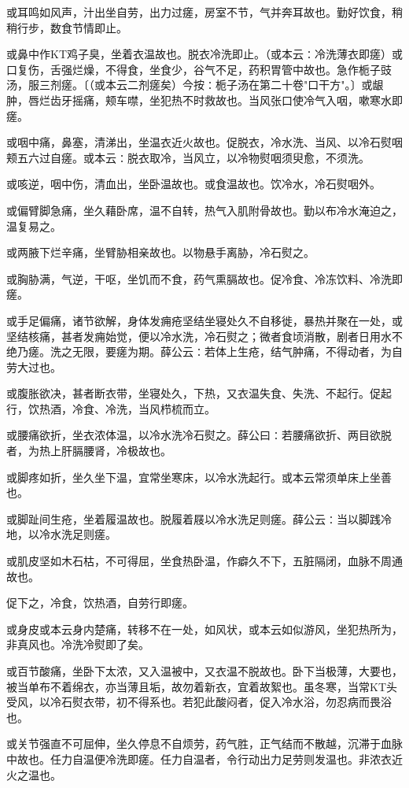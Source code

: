 \documentclass[a4paper,12pt,UTF8,twoside]{ctexbook}
\begin{document}
或耳鸣如风声，汁出坐自劳，出力过瘥，房室不节，气并奔耳故也。勤好饮食，稍稍行步，数食节情即止。

或鼻中作KT鸡子臭，坐着衣温故也。脱衣冷洗即止。（或本云∶冷洗薄衣即瘥）或口复伤，舌强烂燥，不得食，坐食少，谷气不足，药积胃管中故也。急作栀子豉汤，服三剂瘥。〔（或本云二剂瘥矣）今按∶栀子汤在第二十卷"口干方"。〕或龈肿，唇烂齿牙摇痛，颊车噤，坐犯热不时救故也。当风张口使冷气入咽，嗽寒水即瘥。

或咽中痛，鼻塞，清涕出，坐温衣近火故也。促脱衣，冷水洗、当风、以冷石熨咽颊五六过自瘥。或本云∶脱衣取冷，当风立，以冷物熨咽须臾愈，不须洗。

或咳逆，咽中伤，清血出，坐卧温故也。或食温故也。饮冷水，冷石熨咽外。

或偏臂脚急痛，坐久藉卧席，温不自转，热气入肌附骨故也。勤以布冷水淹迫之，温复易之。

或两腋下烂辛痛，坐臂胁相亲故也。以物悬手离胁，冷石熨之。

或胸胁满，气逆，干呕，坐饥而不食，药气熏膈故也。促冷食、冷冻饮料、冷洗即瘥。

或手足偏痛，诸节欲解，身体发痈疮坚结坐寝处久不自移徙，暴热并聚在一处，或坚结核痛，甚者发痈始觉，便以冷水洗，冷石熨之；微者食顷消散，剧者日用水不绝乃瘥。洗之无限，要瘥为期。薛公云∶若体上生疮，结气肿痛，不得动者，为自劳大过也。

或腹胀欲决，甚者断衣带，坐寝处久，下热，又衣温失食、失洗、不起行。促起行，饮热酒，冷食、冷洗，当风栉梳而立。

或腰痛欲折，坐衣浓体温，以冷水洗冷石熨之。薛公曰∶若腰痛欲折、两目欲脱者，为热上肝膈腰肾，冷极故也。

或脚疼如折，坐久坐下温，宜常坐寒床，以冷水洗起行。或本云常须单床上坐善也。

或脚趾间生疮，坐着履温故也。脱履着屐以冷水洗足则瘥。薛公云∶当以脚践冷地，以冷水洗足则瘥。

或肌皮坚如木石枯，不可得屈，坐食热卧温，作癖久不下，五脏隔闭，血脉不周通故也。

促下之，冷食，饮热酒，自劳行即瘥。

或身皮或本云身内楚痛，转移不在一处，如风状，或本云如似游风，坐犯热所为，非真风也。冷洗冷熨即了矣。

或百节酸痛，坐卧下太浓，又入温被中，又衣温不脱故也。卧下当极薄，大要也，被当单布不着绵衣，亦当薄且垢，故勿着新衣，宜着故絮也。虽冬寒，当常KT头受风，以冷石熨衣带，初不得系也。若犯此酸闷者，促入冷水浴，勿忍病而畏浴也。

或关节强直不可屈伸，坐久停息不自烦劳，药气胜，正气结而不散越，沉滞于血脉中故也。任力自温便冷洗即瘥。任力自温者，令行动出力足劳则发温也。非浓衣近火之温也。
\end{document}
